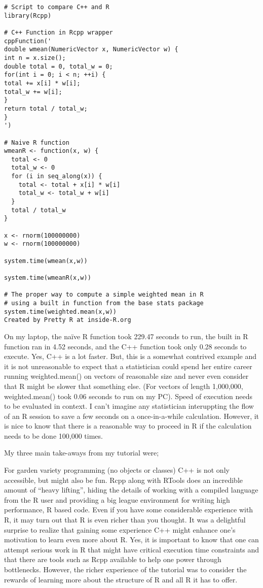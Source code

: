 \documentclass[]{article}
\begin{document}
\begin{framed}
\begin{verbatim}
# Script to compare C++ and R
library(Rcpp)
 
# C++ Function in Rcpp wrapper
cppFunction('
double wmean(NumericVector x, NumericVector w) {
int n = x.size();
double total = 0, total_w = 0;
for(int i = 0; i < n; ++i) {
total += x[i] * w[i];
total_w += w[i];
}
return total / total_w;
}
')
 
# Naive R function
wmeanR <- function(x, w) {
  total <- 0
  total_w <- 0
  for (i in seq_along(x)) {
    total <- total + x[i] * w[i]
    total_w <- total_w + w[i]
  }
  total / total_w
}
 
x <- rnorm(100000000)
w <- rnorm(100000000)
 
system.time(wmean(x,w))
 
system.time(wmeanR(x,w))
 
# The proper way to compute a simple weighted mean in R
# using a built in function from the base stats package
system.time(weighted.mean(x,w))
Created by Pretty R at inside-R.org
\end{verbatim}
\end{framed}
On my laptop, the naïve R function took 229.47 seconds to run, the built in R function ran in 4.52 seconds, and the C++ function took only 0.28 seconds to execute. Yes, C++ is a lot faster. But, this is a somewhat contrived example and it is not unreasonable to expect that a statistician could spend her entire career running weighted.mean() on vectors of reasonable size and never even consider that R might be slower that something else. (For vectors of length 1,000,000, weighted.mean() took 0.06 seconds to run on my PC). Speed of execution needs to be evaluated in context. I can't imagine any statistician interuppting the flow of an R session to save a few seconds on a once-in-a-while calculation. However, it is nice to know that there is a reasonable way to proceed in R if the calculation needs to be done 100,000 times.

My three main take-aways from my tutorial were;

For garden variety programming (no objects or classes) C++ is not only accessible, but might also be fun.
Rcpp along with RTools does an incredible amount of “heavy lifting”, hiding the details of working with a compiled language from the R user and providing a big league environment for writing high performance, R based code.
Even if you have some considerable experience with R, it may turn out that R is even richer than you thought.
It was a delightful surprise to realize that gaining some experience C++ might enhance one’s motivation to learn even more about R. Yes, it is important to know that one can attempt serious work in R that might have critical execution time constraints and that there are tools such as Rcpp available to help one power through bottlenecks. However, the richer experience of the tutorial was to consider the rewards of learning more about the structure of R and all R it has to offer.
\end{document}
